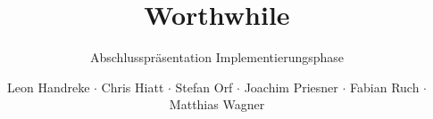 \documentclass[t]{beamer}
\title{Worthwhile}
\subtitle{Abschlusspräsentation Implementierungsphase}
\author{Leon Handreke $\cdot$ Chris Hiatt $\cdot$ Stefan Orf $\cdot$ Joachim Priesner $\cdot$ Fabian Ruch $\cdot$ Matthias Wagner}
\institute[ITI]{Institut für Theoretische Informatik}
\begin{document}
\begin{frame}
\maketitle
\end{frame}







\end{document}
